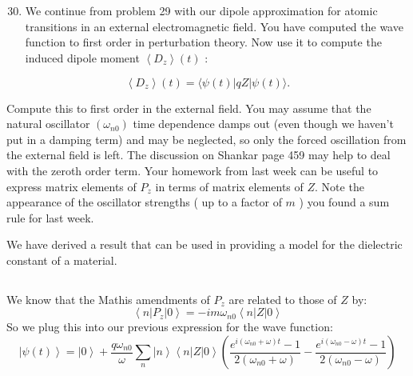 \documentclass[12pt]{article}
\begin{document}
\section{}
\begin{enumerate}
  \setcounter{enumi}{29}
  \item We continue from problem 29 with our dipole approximation for atomic transitions in an external electromagnetic field. You have computed the wave function to first order in perturbation theory. Now use it to compute the induced dipole moment $\left\langle D_{z}\right\rangle(t)$ :
\end{enumerate}


\begin{equation*}
\left\langle D_{z}\right\rangle(t)=\langle\psi(t)|q Z| \psi(t)\rangle . \tag{2}
\end{equation*}


Compute this to first order in the external field. You may assume that the natural oscillator $\left(\omega_{n 0}\right)$ time dependence damps out (even though we haven't put in a damping term) and may be neglected, so only the forced oscillation from the external field is left. The discussion on Shankar page 459 may help to deal with the zeroth order term. Your homework from last week can be useful to express matrix elements of $P_{z}$ in terms of matrix elements of $Z$. Note the appearance of the oscillator strengths ( up to a factor of $m$ ) you found a sum rule for last week.

We have derived a result that can be used in providing a model for the dielectric constant of a material.
\subsection{}
We know that the Mathis amendments of $P_z$ are related to those of $Z$ by:
\begin{equation}
\left\langle n\left|P_{z}\right|0\right\rangle = -i m \omega_{n 0} \left\langle n\left|Z\right|0\right\rangle
\end{equation}
So we plug this into our previous expression for the wave function:
\begin{equation}
\left|\psi(t) \right\rangle = \left|0\right\rangle + \frac{q \omega _{n0}}{\omega } \sum_{n} \left|n\right\rangle \left\langle n\left|Z\right|0\right\rangle \left( \frac{e^{i (\omega _{n0} + \omega) t} - 1}{2 (\omega _{n0} + \omega)} - \frac{e^{i (\omega _{n0} - \omega) t} - 1}{2 (\omega _{n0} - \omega)} \right)
\end{equation}
\end{document}
